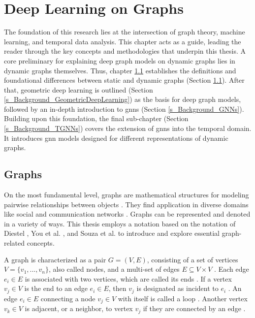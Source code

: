 \section{Deep Learning on Graphs}
\label{s_Background}

The foundation of this research lies at the intersection of graph theory, machine learning, and temporal data analysis. 
This chapter acts as a guide, leading the reader through the key concepts and methodologies that underpin this thesis.%
A core preliminary for explaining deep graph models on dynamic graphs lies in dynamic graphs themselves. Thus, chapter \ref{s_Background_Graphs} establishes the definitions and foundational differences between static and dynamic graphs (Section \ref{s_Background_Graphs}). After that, geometric deep learning is outlined (Section \ref{s_Background_GeometricDeepLearning}) as the basis for deep graph models, followed by an in-depth introduction to \glspl{gnn} (Section \ref{s_Background_GNNs}). Building upon this foundation, the final sub-chapter (Section \ref{s_Background_TGNNs}) covers the extension of \glspl{gnn} into the temporal domain. It introduces \gls{gnn} models designed for different representations of dynamic graphs. 

\subsection{Graphs}
\label{s_Background_Graphs}
On the most fundamental level, graphs are mathematical structures for modeling pairwise relationships between objects \cite{diestel_graph_2017}. They find application in diverse domains like social and communication networks \cite{bronstein_geometric_2017}. Graphs can be represented and denoted in a variety of ways. This thesis employs a notation based on the notation of Diestel \cite{diestel_graph_2017}, You et al. \cite{you_roland_2022}, and Souza et al. \cite{souza_provably_2022} to introduce and explore essential graph-related concepts.

A graph is characterized as a pair $G = (V, E)$, consisting of a set of vertices $V= \{v_1,...,v_n\}$, also called nodes, and a multi-set of edges $E \subseteq V \times V$ \cite{diestel_graph_2017, you_roland_2022}. Each edge $e_i \in E$ is associated with two vertices, which are called its ends \cite{diestel_graph_2017}. If a vertex $v_j \in V$ is the end to an edge $e_i \in E$, then $v_j$ is designated as incident to $e_i$ \cite{diestel_graph_2017}. An edge $e_i \in E$ connecting a node $v_j \in V$ with itself is called a loop \cite{diestel_graph_2017}. Another vertex $v_k \in V$ is adjacent, or a neighbor, to vertex $v_j$ if they are connected by an edge \cite{diestel_graph_2017}. 


